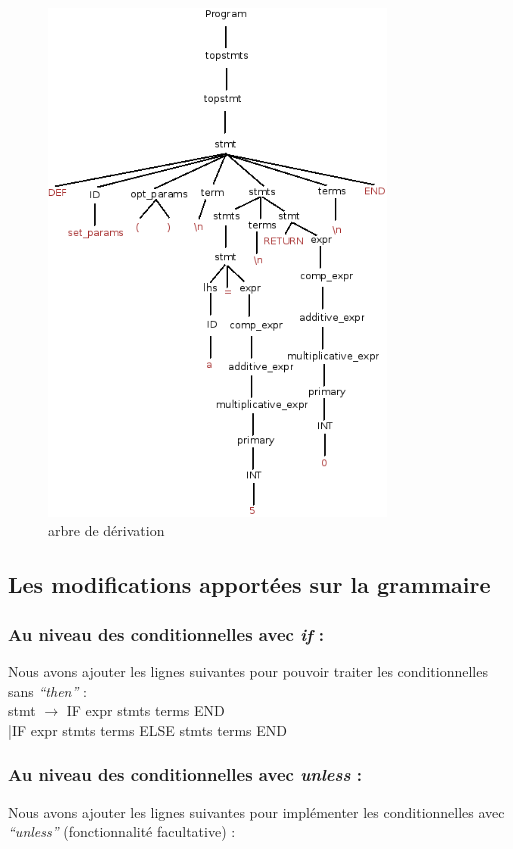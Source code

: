 \documentclass{article}
\begin{document}
\newpage
\begin{figure}[!h]
\includegraphics[width=0.8\textwidth]{Diagramme1.png}
\caption{arbre de dérivation}
\end{figure}


\subsection{Les modifications apportées sur la grammaire}
\subsubsection*{Au niveau des conditionnelles avec \emph{if} :}
Nous avons ajouter les lignes suivantes pour pouvoir traiter les conditionnelles sans \emph{``then''} : \\

\noindent stmt $\rightarrow$ IF expr stmts terms END \\
|IF expr stmts terms ELSE stmts terms END \\ 

\subsubsection*{Au niveau des conditionnelles avec \emph{unless} :}
Nous avons ajouter les lignes suivantes pour implémenter les conditionnelles avec \emph{``unless''} (fonctionnalité facultative) : \\
\end{document}
